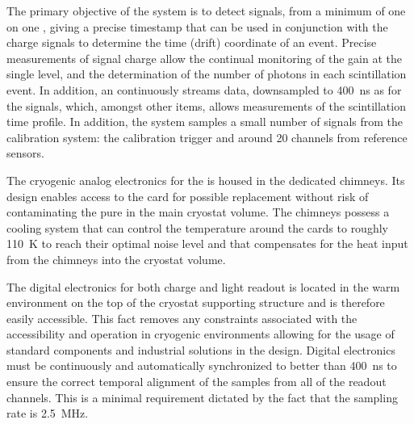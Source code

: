 
The primary objective of the  system is to detect signals, from a minimum of one \phel on one , giving a precise timestamp that can be used in conjunction with the charge signals to determine the time (drift) coordinate of an event.   Precise measurements of signal charge allow the continual monitoring of the  gain at the single \phel level, and the determination of the number of photons in each scintillation event.  In addition, an   continuously streams data, downsampled to \SI{400}{ns} as for the  signals,  which, amongst other items, allows measurements of the scintillation time profile. In addition, the  system samples a small number of signals from the  calibration system: the calibration trigger and around \num{20} channels from reference sensors.

The cryogenic analog electronics for the  is housed in the dedicated  chimneys. %
Its design %
enables access to the  card for possible replacement without %
risk of contaminating the pure \lar in the main cryostat volume. The chimneys %
possess a cooling system that can control the temperature around the  cards to roughly \SI{110}{\kelvin} %
to reach their optimal noise level and %
that compensates for the heat input from the chimneys into the cryostat volume. 

The digital electronics for both charge and light readout is located in the warm environment on the top of the cryostat supporting structure and is therefore easily accessible. This fact removes any constraints associated with the accessibility and operation in cryogenic environments allowing for the usage of standard components and industrial solutions in the design. Digital electronics must be continuously and automatically synchronized to better than \SI{400}{\nano\s} to ensure the correct temporal alignment of the  samples from all of the readout channels. This is a minimal requirement dictated by the fact that the sampling rate is \SI{2.5}{\MHz}.  

